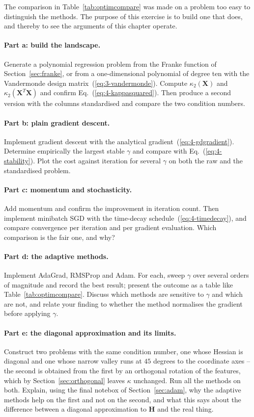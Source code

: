 The comparison in Table~\ref{tab:optimcompare} was made on a problem too easy
to distinguish the methods.  The purpose of this exercise is to build one that
does, and thereby to see the arguments of this chapter operate.

\paragraph{Part a: build the landscape.}
Generate a polynomial regression problem from the Franke function of
Section~\ref{sec:franke}, or from a one-dimensional polynomial of degree ten
with the Vandermonde design matrix~(\ref{eq:3-vandermonde}).  Compute
$\kappa_2(\bm{X})$ and $\kappa_2(\bm{X}^{T}\bm{X})$ and confirm
Eq.~(\ref{eq:4-kappasquared}).  Then produce a second version with the columns
standardised and compare the two condition numbers.

\paragraph{Part b: plain gradient descent.}
Implement gradient descent with the analytical
gradient~(\ref{eq:4-gdgradient}).  Determine empirically the largest stable
$\gamma$ and compare with Eq.~(\ref{eq:4-stability}).  Plot the cost against
iteration for several $\gamma$ on both the raw and the standardised problem.

\paragraph{Part c: momentum and stochasticity.}
Add momentum and confirm the improvement in iteration count.  Then implement
minibatch SGD with the time-decay schedule~(\ref{eq:4-timedecay}), and compare
convergence per iteration and per gradient evaluation.  Which comparison is
the fair one, and why?

\paragraph{Part d: the adaptive methods.}
Implement AdaGrad, RMSProp and Adam.  For each, sweep $\gamma$ over several
orders of magnitude and record the best result; present the outcome as a table
like Table~\ref{tab:optimcompare}.  Discuss which methods are sensitive to
$\gamma$ and which are not, and relate your finding to whether the method
normalises the gradient before applying $\gamma$.

\paragraph{Part e: the diagonal approximation and its limits.}
Construct two problems with the same condition number, one whose Hessian is
diagonal and one whose narrow valley runs at $45$ degrees to the coordinate
axes -- the second is obtained from the first by an orthogonal rotation of the
features, which by Section~\ref{sec:orthogonal} leaves $\kappa$ unchanged.
Run all the methods on both.  Explain, using the final notebox of
Section~\ref{sec:adam}, why the adaptive methods help on the first and not on
the second, and what this says about the difference between a diagonal
approximation to $\bm{H}$ and the real thing.

